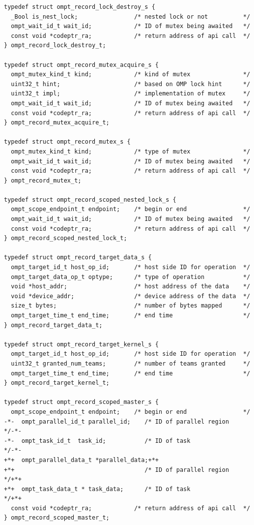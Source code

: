 \documentclass{article}
\begin{document}
\begin{lstlisting}
typedef struct ompt_record_lock_destroy_s {
  _Bool is_nest_lock;                /* nested lock or not          */
  ompt_wait_id_t wait_id;            /* ID of mutex being awaited   */
  const void *codeptr_ra;            /* return address of api call  */       
} ompt_record_lock_destroy_t;

typedef struct ompt_record_mutex_acquire_s {
  ompt_mutex_kind_t kind;            /* kind of mutex               */
  uint32_t hint;                     /* based on OMP lock hint      */
  uint32_t impl;                     /* implementation of mutex     */
  ompt_wait_id_t wait_id;            /* ID of mutex being awaited   */
  const void *codeptr_ra;            /* return address of api call  */          
} ompt_record_mutex_acquire_t;

typedef struct ompt_record_mutex_s {
  ompt_mutex_kind_t kind;            /* type of mutex               */
  ompt_wait_id_t wait_id;            /* ID of mutex being awaited   */
  const void *codeptr_ra;            /* return address of api call  */       
} ompt_record_mutex_t;

typedef struct ompt_record_scoped_nested_lock_s {
  ompt_scope_endpoint_t endpoint;    /* begin or end                */
  ompt_wait_id_t wait_id;            /* ID of mutex being awaited   */
  const void *codeptr_ra;            /* return address of api call  */       
} ompt_record_scoped_nested_lock_t;

typedef struct ompt_record_target_data_s {
  ompt_target_id_t host_op_id;       /* host side ID for operation  */
  ompt_target_data_op_t optype;      /* type of operation           */
  void *host_addr;                   /* host address of the data    */
  void *device_addr;                 /* device address of the data  */ 
  size_t bytes;                      /* number of bytes mapped      */
  ompt_target_time_t end_time;       /* end time                    */
} ompt_record_target_data_t;

typedef struct ompt_record_target_kernel_s {
  ompt_target_id_t host_op_id;       /* host side ID for operation  */
  uint32_t granted_num_teams;        /* number of teams granted     */
  ompt_target_time_t end_time;       /* end time                    */
} ompt_record_target_kernel_t;

typedef struct ompt_record_scoped_master_s {
  ompt_scope_endpoint_t endpoint;    /* begin or end                */
-*-  ompt_parallel_id_t parallel_id;    /* ID of parallel region       */-*-
-*-  ompt_task_id_t  task_id;           /* ID of task                  */-*-
+*+  ompt_parallel_data_t *parallel_data;+*+
+*+                                     /* ID of parallel region       */+*+
+*+  ompt_task_data_t * task_data;      /* ID of task                  */+*+
  const void *codeptr_ra;            /* return address of api call  */
} ompt_record_scoped_master_t;


\end{lstlisting}
\end{document}

